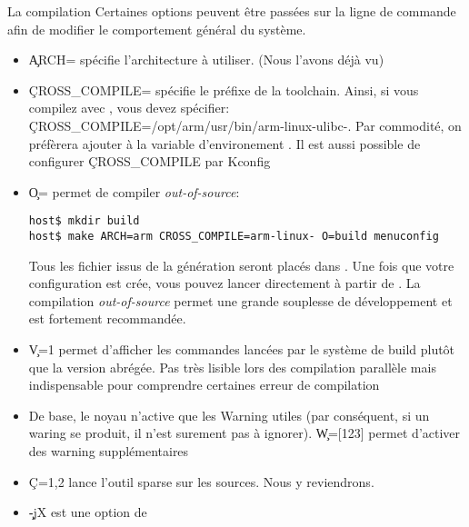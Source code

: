 \begin{frame}[fragile=singleslide]{La compilation}
  Certaines options peuvent être passées sur la ligne de commande afin
  de modifier le comportement général du système.
  \begin{itemize}
  \item  \c{ARCH=} spécifie l'architecture  à utiliser.  (Nous l'avons
    déjà vu)
  \item \c{CROSS_COMPILE=} spécifie le préfixe de la toolchain. Ainsi,
    si vous  compilez avec ,
    vous                        devez                       spécifier:
    \c{CROSS_COMPILE=/opt/arm/usr/bin/arm-linux-ulibc-}.            Par
    commodité,  on  préfèrera   ajouter    à  la
    variable  d'environement  .  Il  est aussi  possible  de
    configurer \c{CROSS_COMPILE} par Kconfig
  \item \c{O=} permet de compiler \emph{out-of-source}:
    \begin{lstlisting}
host$ mkdir build
host$ make ARCH=arm CROSS_COMPILE=arm-linux- O=build menuconfig
    \end{lstlisting} %
    Tous  les  fichier  issus  de  la génération  seront  placés  dans
    .  Une fois  que  votre configuration  est crée,  vous
    pouvez lancer  directement  à partir de . La
    compilation  \emph{out-of-source} permet  une grande  souplesse de
    développement et est fortement recommandée.
  \item \c{V=1} permet d'afficher les commandes lancées par le système
    de build plutôt que la  version abrégée. Pas très lisible lors des
    compilation parallèle mais indispensable pour comprendre certaines
    erreur de compilation
  \item  De  base, le  noyau  n'active  que  les Warning  utiles  (par
    conséquent,  si un  waring se  produit,  il n'est  surement pas  à
    ignorer).     \c{W=[123]}    permet    d'activer    des    warning
    supplémentaires
  \item  \c{C={1,2}} lance  l'outil  sparse sur  les  sources. Nous  y
    reviendrons.
   \item \c{-jX} est une option de 
  \end{itemize} 
\end{frame}

